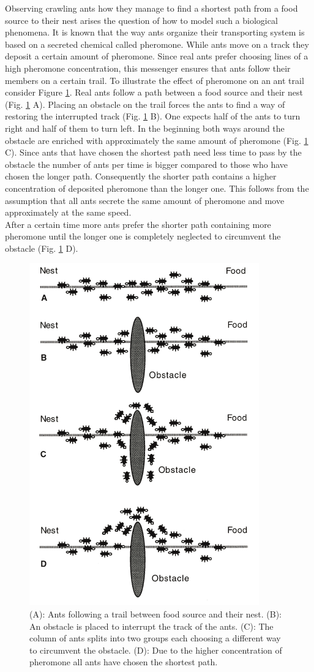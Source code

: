 
Observing crawling ants how they manage to find a shortest path from a food source to their nest arises the question of how to model such a biological phenomena. It is known that the way ants organize their transporting system is based on a secreted chemical called pheromone. While ants move on a track they deposit a certain amount of pheromone. Since real ants prefer choosing lines of a high pheromone concentration, this messenger ensures that ants follow their members on a certain trail.
To illustrate the effect of pheromone on an ant trail consider Figure \ref{fig:ants}. Real ants follow a path between a food source and their nest (Fig. \ref{fig:ants} A). Placing an obstacle on the trail forces the ants to find a way of restoring the interrupted track (Fig. \ref{fig:ants} B). One expects half of the ants to turn right and half of them to turn left. In the beginning both ways around the obstacle are enriched with approximately the same amount of pheromone (Fig. \ref{fig:ants} C). Since ants that have chosen the shortest path need less time to pass by the obstacle the number of ants per time is bigger compared to those who have chosen the longer path. Consequently the shorter path contains a higher concentration of deposited pheromone than the longer one. This follows from the assumption that all ants secrete the same amount of pheromone and move approximately at the same speed. \\
After a certain time more ants prefer the shorter path containing more pheromone until the longer one is completely neglected to circumvent the obstacle (Fig. \ref{fig:ants} D).

\begin{figure}
\includegraphics[width=0.5\linewidth]{ants}
\caption{(A): Ants following a trail between food source and their nest. (B): An obstacle is placed to interrupt the track of the ants. (C): The column of ants splits into two groups each choosing a different way to circumvent the obstacle. (D): Due to the higher concentration of pheromone all ants have chosen the shortest path.}
\label{fig:ants}
\end{figure}

